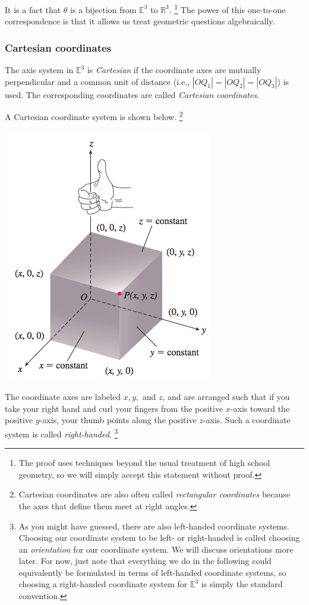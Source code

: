 \documentclass[12pt,letterpaper,reqno]{article}
\numberwithin{equation}{section}
\newcommand{\ti}[1]{\textit{#1}}
\begin{document}
It is a fact that $\theta$ is a bijection from $\mathbb{E}^3$ to $\mathbb{R}^3$. \footnote{The proof uses techniques beyond the usual treatment of high school geometry, so we will simply accept this statement without proof.} The power of this one-to-one correspondence is that it allows us treat geometric questions algebraically.

\subsubsection{Cartesian coordinates}
\begin{defn}
	The axis system in $\mathbb{E}^3$ is \ti{Cartesian} if the coordinate axes are mutually perpendicular and a common unit of distance (i.e., $|OQ_1|=|OQ_2|=|OQ_3|$) is used. The corresponding coordinates are called \ti{Cartesian coordinates}.
\end{defn}
A Cartesian coordinate system is shown below. \footnote{Cartesian coordinates are also often called \ti{rectangular coordinates} because the axes that define them meet at right angles.}
\begin{center}
	\includegraphics[scale=0.5]{figures_mvc/cartesian_coordinate_system}
\end{center}
The coordinate axes are labeled $x,y,$ and $z$, and are arranged such that if you take your right hand and curl your fingers from the positive $x$-axis toward the positive $y$-axis, your thumb points along the positive $z$-axis. Such a coordinate system is called \ti{right-handed}. \footnote{As you might have guessed, there are also left-handed coordinate systems. Choosing our coordinate system to be left- or right-handed is called choosing an \ti{orientation} for our coordinate system. We will discuss orientations more later. For now, just note that everything we do in the following could equivalently be formulated in terms of left-handed coordinate systems, so choosing a right-handed coordinate system for $\mathbb{E}^3$ is simply the standard convention.}
\end{document}
